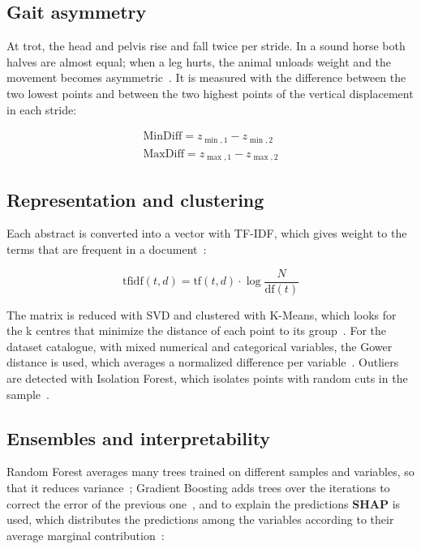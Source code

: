 \documentclass[conference,a4paper]{IEEEtran}
\begin{document}
\subsection{Gait asymmetry}

At trot, the head and pelvis rise and fall twice per stride. In a sound horse both halves are almost equal; when a leg hurts, the animal unloads weight and the movement becomes asymmetric~\cite{keegan2013}. It is measured with the difference between the two lowest points and between the two highest points of the vertical displacement in each stride:

\begin{gather*}
\mathrm{MinDiff} = z_{\min,1} - z_{\min,2} \\
\mathrm{MaxDiff} = z_{\max,1} - z_{\max,2}
\end{gather*}

\subsection{Representation and clustering}

Each abstract is converted into a vector with TF-IDF, which gives weight to the terms that are frequent in a document~\cite{salton1988}:

\[
\mathrm{tfidf}(t,d) = \mathrm{tf}(t,d)\cdot \log\frac{N}{\mathrm{df}(t)}
\]

The matrix is reduced with SVD and clustered with K-Means, which looks for the k centres that minimize the distance of each point to its group~\cite{lloyd1982}. For the dataset catalogue, with mixed numerical and categorical variables, the Gower distance is used, which averages a normalized difference per variable~\cite{gower1971}. Outliers are detected with Isolation Forest, which isolates points with random cuts in the sample~\cite{liu2008}.

\subsection{Ensembles and interpretability}

Random Forest averages many trees trained on different samples and variables, so that it reduces variance~\cite{breiman2001}; Gradient Boosting adds trees over the iterations to correct the error of the previous one~\cite{friedman2001}, and to explain the predictions \textbf{SHAP} is used, which distributes the predictions among the variables according to their average marginal contribution~\cite{lundberg2017}:
\end{document}
